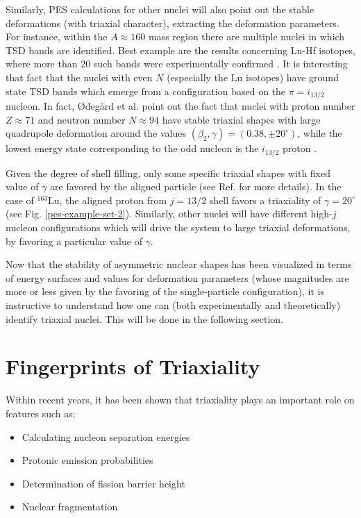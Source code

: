 Similarly, PES calculations for other nuclei will also point out the stable deformations (with triaxial character), extracting the deformation parameters. For instance, within the $A\approx160$ mass region there are multiple nuclei in which TSD bands are identified. Best example are the results concerning Lu-Hf isotopes, where more than 20 such bands were experimentally confirmed \cite{gu2007theoretical}. It is interesting that fact that the nuclei with even $N$ (especially the Lu isotopes) have ground state TSD bands which emerge from a configuration based on the $\pi=i_{13/2}$ nucleon. In fact, Ødegård et al. \cite{odegaard2001evidence} point out the fact that nuclei with proton number $Z\approx 71$ and neutron number $N\approx 94$ have stable triaxial shapes with large quadrupole deformation around the values $(\beta_2,\gamma)=(0.38,\pm 20^\circ)$, while the lowest energy state corresponding to the odd nucleon is the $i_{13/2}$ proton \cite{schnack1995superdeformed}.

Given the degree of shell filling, only some specific triaxial shapes with fixed value of $\gamma$ are favored by the aligned particle (see Ref. \cite{hamamoto1983intrinsic} for more details). In the case of $^{163}$Lu, the aligned proton from $j=13/2$ shell favors a triaxiality of $\gamma=20^\circ$ (see Fig. \ref{pes-example-set-2}). Similarly, other nuclei will have different high-$j$ nucleon configurations which will drive the system to large triaxial deformations, by favoring a particular value of $\gamma$.

Now that the stability of asymmetric nuclear shapes has been visualized in terms of energy surfaces and values for deformation parameters (whose magnitudes are more or less given by the favoring of the single-particle configuration), it is instructive to understand how one can (both experimentally and theoretically) identify triaxial nuclei. This will be done in the following section.

\section{Fingerprints of Triaxiality}

Within recent years, it has been shown that triaxiality plays an important role on features such as:
\begin{itemize}
    \item Calculating nucleon separation energies \cite{moller2006global}
    \item Protonic emission probabilities \cite{qi2019recent,budaca2022deformation}
    \item Determination of fission barrier height \cite{moller2009heavy,lu2012potential}
    \item Nuclear fragmentation \cite{palumbo1985splitting}
\end{itemize}

